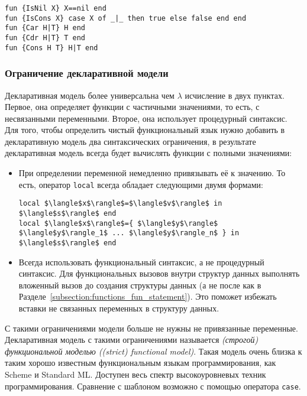 \begin{lstlisting}[mathescape=false]
fun {IsNil X} X==nil end
fun {IsCons X} case X of _|_ then true else false end end
fun {Car H|T} H end
fun {Cdr H|T} T end
fun {Cons H T} H|T end
\end{lstlisting}

\subsubsection{Ограничение декларативной модели}

Декларативная модель более универсальна чем $\lambda$ исчисление в двух пунктах. Первое, она определяет функции с частичными значениями, то есть, с несвязанными переменными. Второе, она использует процедурный синтаксис. Для того, чтобы определить чистый функциональный язык нужно добавить в декларативную модель два синтаксических ограничения, в результате декларативная модель всегда будет вычислять функции с полными значениями:

\begin{itemize}

\item{При определении переменной немедленно привязывать её к значению. То есть, оператор \lstinline!local! всегда обладает следующими двумя формами:

  \begin{lstlisting}
local $\langle$x$\rangle$=$\langle$v$\rangle$ in $\langle$s$\rangle$ end
local $\langle$x$\rangle$={ $\langle$y$\rangle$ $\langle$y$\rangle_1$ ... $\langle$y$\rangle_n$ } in $\langle$s$\rangle$ end
\end{lstlisting}
}

\item{Всегда использовать функциональный синтаксис, а не процедурный синтаксис. Для функциональных вызовов внутри структур данных выполнять вложенный вызов до создания структуры данных (а не после как в Разделе~\ref{subsection:functions_fun_statement}). Это поможет избежать вставки не связанных переменных в структуру данных.}
  
\end{itemize}

С такими ограничениями модели больше не нужны не привязанные переменные. Декларативная модель с такими ограничениями называется \emph{(строгой) функциональной моделью ((strict) functional model)}. Такая модель очень близка к таким хорошо известным функциональным языкам программирования, как Scheme и Standard ML. Доступен весь спектр высокоуровневых техник программирования. Сравнение с шаблоном возможно с помощью оператора \lstinline!case!.

